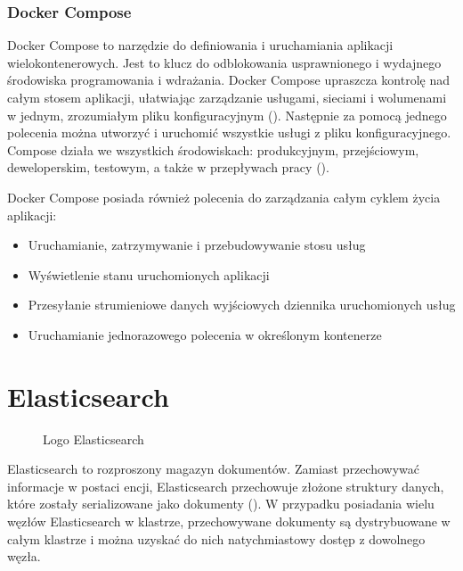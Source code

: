 \subsubsection{Docker Compose}

Docker Compose to narzędzie do definiowania i uruchamiania aplikacji wielokontenerowych. Jest to klucz do odblokowania usprawnionego i wydajnego środowiska programowania i wdrażania.
Docker Compose upraszcza kontrolę nad całym stosem aplikacji, ułatwiając zarządzanie usługami, sieciami i wolumenami w jednym, zrozumiałym pliku konfiguracyjnym  (). Następnie za pomocą jednego polecenia można utworzyć i uruchomić wszystkie usługi z pliku konfiguracyjnego. Compose działa we wszystkich środowiskach: produkcyjnym, przejściowym, deweloperskim, testowym, a także w przepływach pracy  ()\cite{dockerComposeAStudyMultiContainerSystem}\cite{dockerComposeOverview}\cite{dockerComposePaterns}.

Docker Compose posiada również polecenia do zarządzania całym cyklem życia aplikacji: 
\begin{itemize}
    \item Uruchamianie, zatrzymywanie i przebudowywanie stosu usług
    \item Wyświetlenie stanu uruchomionych aplikacji
    \item Przesyłanie strumieniowe danych wyjściowych dziennika uruchomionych usług
    \item Uruchamianie jednorazowego polecenia w określonym kontenerze
\end{itemize}

\section{Elasticsearch}

\begin{figure}[!htbp]
    \centering
    
    \caption{Logo Elasticsearch \cite{elasticSearchManualDataIn}}
    \label{fig:enter-label}
\end{figure}

Elasticsearch to rozproszony magazyn dokumentów. Zamiast przechowywać informacje w postaci encji, Elasticsearch przechowuje złożone struktury danych, które zostały serializowane jako dokumenty  (). W przypadku posiadania wielu węzłów Elasticsearch w klastrze, przechowywane dokumenty są dystrybuowane w całym klastrze i można uzyskać do nich natychmiastowy dostęp z dowolnego węzła\cite{elasticSearchManualDataIn}. 

